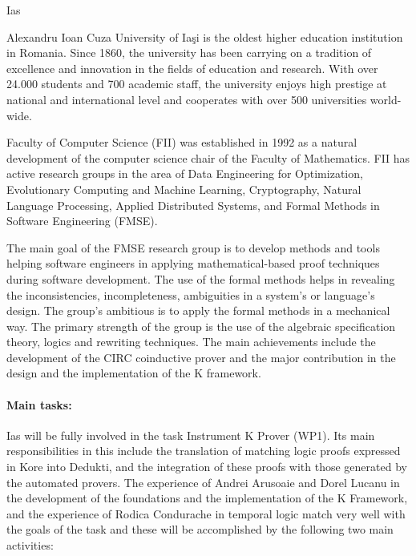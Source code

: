 \begin{sitedescription}{Ias}



Alexandru Ioan Cuza University of Iaşi is the oldest higher education institution in Romania. 
Since 1860, the university has been carrying on a tradition of excellence and innovation in 
the fields of education and research. With over 24.000 students and 700 academic staff, 
the university enjoys high prestige at national and international level and cooperates with  
over 500 universities world-wide. 

Faculty of Computer Science (FII) was established in 1992 as a natural development of the computer 
science chair of the Faculty of Mathematics. FII has active research groups in the area of 
Data Engineering for Optimization, Evolutionary Computing and Machine Learning, Cryptography,
Natural Language Processing, Applied Distributed Systems, and Formal Methods in Software Engineering (FMSE).

The main goal of the FMSE research group is to develop methods and tools helping software
engineers in applying mathematical-based proof techniques during software development.
The use of the formal methods helps in revealing the inconsistencies, incompleteness,
ambiguities in a system's or language's design. The group’s ambitious is to apply the formal
methods in a mechanical way. The primary strength of the group is the use of the algebraic
specification theory, logics and rewriting techniques. The main achievements include the
development of the CIRC coinductive prover and the major contribution in the design and the
implementation of the K framework.

\paragraph{Main tasks:}

Ias will be fully involved in the task Instrument K Prover (WP1). Its main responsibilities in this 
include the translation of matching logic proofs expressed in Kore into Dedukti, and the integration
of these proofs with those generated by the automated provers. The experience of Andrei Arusoaie and 
Dorel Lucanu in the development of the foundations and the implementation of the K Framework, and
the experience of Rodica Condurache in temporal logic match very well with the goals of the task and
 these will be  accomplished by the following two main activities:


\end{sitedescription}
